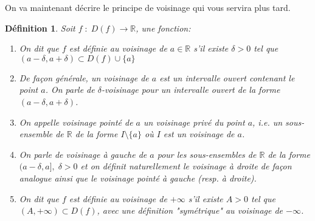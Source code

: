 \documentclass[a4paper, 12pt, french, twoside]{article}
\newtheorem{defi}[theorem]{Définition}
\newcommand{\Rr}{{\mathbb{R}}}
\begin{document}
On va maintenant décrire le principe de voisinage qui vous servira plus tard.
\begin{defi}Soit $f\;:\; D(f)\longrightarrow \Rr$, une fonction: 
\begin{enumerate}
    \item On dit que $f$ est définie au voisinage de $a\in \Rr$ s'il existe $\delta >0$ tel que $(a-\delta,a+\delta)\subset D(f)\cup\{a\}$
    \item De façon générale, un voisinage de $a$ est un intervalle ouvert contenant le point $a$. On parle de $\delta $-voisinage pour un intervalle ouvert de la forme $(a-\delta,a+\delta)$. 
    \item On appelle voisinage pointé de $a$ un voisinage privé du point $a$, i.e. un sous-ensemble de $\Rr$ de la forme $I\setminus \{a\}$ où $I$ est un voisinage de $a$.
    \item On parle de voisinage à gauche de $a$ pour les sous-ensembles de $\Rr$ de la forme $(a-\delta,a],\; \delta>0$ et on définit naturellement le voisinage à droite de façon analogue ainsi que le voisinage pointé à gauche (resp. à droite).
    \item On dit que $f$ est définie au voisinage de $+\infty$ s'il existe $A>0$ tel que $(A,+\infty)\subset D(f)$, avec une définition "symétrique" au voisinage de $-\infty$.
\end{enumerate}
\end{defi}
\end{document}
